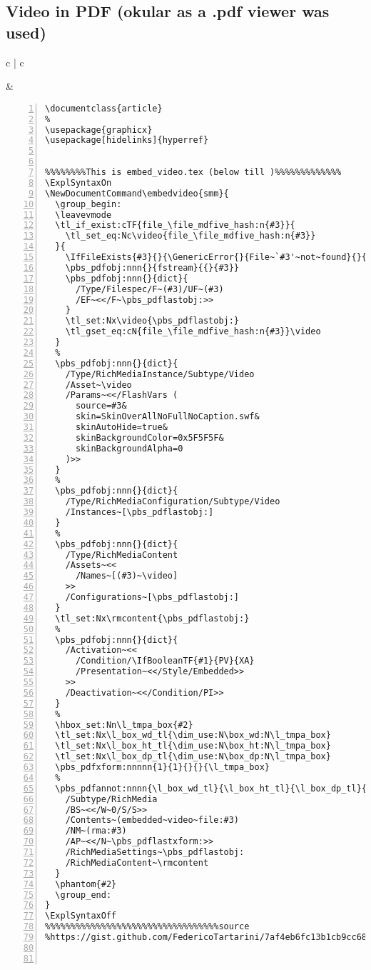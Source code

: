 \subsection{Video in PDF (okular as a .pdf viewer was used)}
\begin{table}[h!]
\begin{tabular}{c | c}
\begin{minipage}[m]{0.4\textwidth}

\end{minipage}
&
\begin{minipage}[m]{0.55\textwidth}
\renewcommand\textminus{\mbox{-}}%

\begin{lstlisting}[numberstyle=\zebra{orange!15}{red!15},numbers=left,basicstyle=\ttfamily\tiny]
\documentclass{article}
%
\usepackage{graphicx}
\usepackage[hidelinks]{hyperref}


%%%%%%%%This is embed_video.tex (below till )%%%%%%%%%%%%% 
\ExplSyntaxOn
\NewDocumentCommand\embedvideo{smm}{
  \group_begin:
  \leavevmode
  \tl_if_exist:cTF{file_\file_mdfive_hash:n{#3}}{
    \tl_set_eq:Nc\video{file_\file_mdfive_hash:n{#3}}
  }{
    \IfFileExists{#3}{}{\GenericError{}{File~`#3'~not~found}{}{}}
    \pbs_pdfobj:nnn{}{fstream}{{}{#3}}
    \pbs_pdfobj:nnn{}{dict}{
      /Type/Filespec/F~(#3)/UF~(#3)
      /EF~<</F~\pbs_pdflastobj:>>
    }
    \tl_set:Nx\video{\pbs_pdflastobj:}
    \tl_gset_eq:cN{file_\file_mdfive_hash:n{#3}}\video
  }
  %
  \pbs_pdfobj:nnn{}{dict}{
    /Type/RichMediaInstance/Subtype/Video
    /Asset~\video
    /Params~<</FlashVars (
      source=#3&
      skin=SkinOverAllNoFullNoCaption.swf&
      skinAutoHide=true&
      skinBackgroundColor=0x5F5F5F&
      skinBackgroundAlpha=0
    )>>
  }
  %
  \pbs_pdfobj:nnn{}{dict}{
    /Type/RichMediaConfiguration/Subtype/Video
    /Instances~[\pbs_pdflastobj:]
  }
  %
  \pbs_pdfobj:nnn{}{dict}{
    /Type/RichMediaContent
    /Assets~<<
      /Names~[(#3)~\video]
    >>
    /Configurations~[\pbs_pdflastobj:]
  }
  \tl_set:Nx\rmcontent{\pbs_pdflastobj:}
  %
  \pbs_pdfobj:nnn{}{dict}{
    /Activation~<<
      /Condition/\IfBooleanTF{#1}{PV}{XA}
      /Presentation~<</Style/Embedded>>
    >>
    /Deactivation~<</Condition/PI>>
  }
  %
  \hbox_set:Nn\l_tmpa_box{#2}
  \tl_set:Nx\l_box_wd_tl{\dim_use:N\box_wd:N\l_tmpa_box}
  \tl_set:Nx\l_box_ht_tl{\dim_use:N\box_ht:N\l_tmpa_box}
  \tl_set:Nx\l_box_dp_tl{\dim_use:N\box_dp:N\l_tmpa_box}
  \pbs_pdfxform:nnnnn{1}{1}{}{}{\l_tmpa_box}
  %
  \pbs_pdfannot:nnnn{\l_box_wd_tl}{\l_box_ht_tl}{\l_box_dp_tl}{
    /Subtype/RichMedia
    /BS~<</W~0/S/S>>
    /Contents~(embedded~video~file:#3)
    /NM~(rma:#3)
    /AP~<</N~\pbs_pdflastxform:>>
    /RichMediaSettings~\pbs_pdflastobj:
    /RichMediaContent~\rmcontent
  }
  \phantom{#2}
  \group_end:
}
\ExplSyntaxOff
%%%%%%%%%%%%%%%%%%%%%%%%%%%%%%%%%%source
%https://gist.github.com/FedericoTartarini/7af4eb6fc13b1cb9cc68b7e8ea823d50



\end{lstlisting}
\end{minipage}
\end{tabular}
\end{table}
